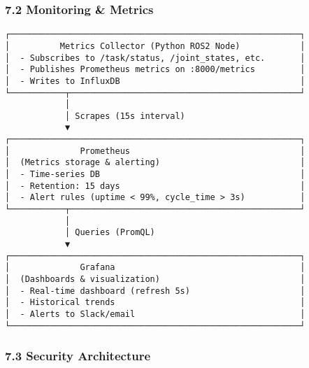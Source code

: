 \documentclass[
]{article}
\begin{document}
\hypertarget{monitoring-metrics}{%
\subsubsection{7.2 Monitoring \& Metrics}\label{monitoring-metrics}}

\begin{verbatim}
┌──────────────────────────────────────────────────────────┐
│          Metrics Collector (Python ROS2 Node)            │
│  - Subscribes to /task/status, /joint_states, etc.       │
│  - Publishes Prometheus metrics on :8000/metrics         │
│  - Writes to InfluxDB                                    │
└───────────┬──────────────────────────────────────────────┘
            │
            │ Scrapes (15s interval)
            ▼
┌──────────────────────────────────────────────────────────┐
│              Prometheus                                  │
│  (Metrics storage & alerting)                            │
│  - Time-series DB                                        │
│  - Retention: 15 days                                    │
│  - Alert rules (uptime < 99%, cycle_time > 3s)           │
└───────────┬──────────────────────────────────────────────┘
            │
            │ Queries (PromQL)
            ▼
┌──────────────────────────────────────────────────────────┐
│              Grafana                                     │
│  (Dashboards & visualization)                            │
│  - Real-time dashboard (refresh 5s)                      │
│  - Historical trends                                     │
│  - Alerts to Slack/email                                 │
└──────────────────────────────────────────────────────────┘
\end{verbatim}

\hypertarget{security-architecture}{%
\subsubsection{7.3 Security Architecture}\label{security-architecture}}
\end{document}
